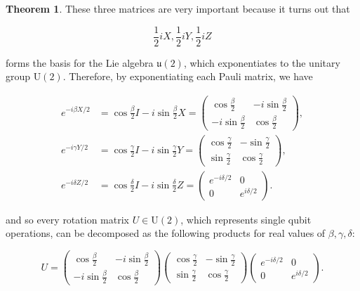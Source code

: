 \documentclass{article}
\theoremstyle{definition}
\newtheorem{theorem}{Theorem}[section]
\begin{document}
    \begin{theorem}
      These three matrices are very important because it turns out that

        \[\frac{1}{2} i X, \frac{1}{2} i Y, \frac{1}{2} i Z\]

      forms the basis for the Lie algebra $\mathfrak{u}(2)$, which exponentiates to the unitary group $\text{U}(2)$. Therefore, by exponentiating each Pauli matrix, we have

      \begin{align*}
        e^{-i \beta X /2} &= \cos \frac{\beta}{2} I - i \sin \frac{\beta}{2} X = \begin{pmatrix} \cos \frac{\beta}{2} & -i \sin \frac{\beta}{2} \\ -i \sin \frac{\beta}{2} & \cos \frac{\beta}{2} \end{pmatrix}, \\
        e^{-i \gamma Y/2} &= \cos \frac{\gamma}{2} I - i \sin \frac{\gamma}{2} Y = \begin{pmatrix} \cos \frac{\gamma}{2} & - \sin \frac{\gamma}{2} \\ \sin \frac{\gamma}{2} & \cos \frac{\gamma}{2} \end{pmatrix}, \\
        e^{-i \delta Z/2} &= \cos \frac{\delta}{2} I - i \sin \frac{\delta}{2} Z = \begin{pmatrix} e^{-i \delta /2} & 0 \\ 0 & e^{i\delta/2} \end{pmatrix}.
      \end{align*}

      and so every rotation matrix $U \in \text{U}(2)$, which represents single qubit operations, can be decomposed as the following products for real values of $\beta, \gamma, \delta$:

      \[
        U = \begin{pmatrix} \cos \frac{\beta}{2} & -i \sin \frac{\beta}{2} \\ -i \sin \frac{\beta}{2} & \cos \frac{\beta}{2} \end{pmatrix} \begin{pmatrix} \cos \frac{\gamma}{2} & - \sin \frac{\gamma}{2} \\ \sin \frac{\gamma}{2} & \cos \frac{\gamma}{2} \end{pmatrix} \begin{pmatrix} e^{-i \delta /2} & 0 \\ 0 & e^{i\delta/2} \end{pmatrix}.
      \]
    \end{theorem}
\end{document}
